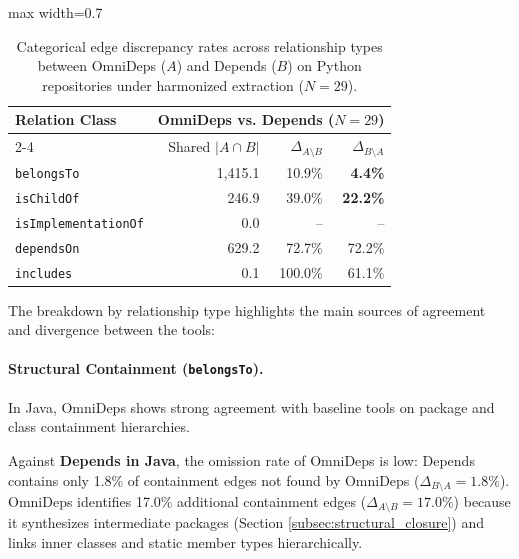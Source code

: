 \begin{table}[htpb]
  \centering
  \small
  \caption{Categorical edge discrepancy rates across relationship
    types between OmniDeps ($A$) and Depends ($B$) on Python repositories
  under harmonized extraction ($N=29$).}
  \label{tab:categorical_discordance_python}
  \vspace{0.4em}
  \begin{adjustbox}{max width=0.7\textwidth}
    \begin{tabular}{lrrr}
      \toprule
      \textbf{Relation Class} &
      \multicolumn{3}{c}{\textbf{OmniDeps vs. Depends ($N=29$)}} \\
      \cmidrule(lr){2-4}
      & Shared $|A \cap B|$ & $\Delta_{A \setminus B}$ & $\Delta_{B
      \setminus A}$ \\
      \midrule
      \texttt{belongsTo}          & 1,415.1 &  10.9\% & \textbf{4.4\%} \\
      \texttt{isChildOf}          &   246.9 &  39.0\% & \textbf{22.2\%} \\
      \texttt{isImplementationOf} &     0.0 &      -- &      --         \\
      \texttt{dependsOn}          &   629.2 &  72.7\% & 72.2\%          \\
      \texttt{includes}           &     0.1 & 100.0\% & 61.1\%          \\
      \bottomrule
    \end{tabular}
  \end{adjustbox}
\end{table}

The breakdown by relationship type highlights the main sources of
agreement and divergence between the tools:

\paragraph{Structural Containment (\texttt{belongsTo}).}
In Java, OmniDeps shows strong agreement with baseline tools on
package and class containment hierarchies.

Against \textbf{Depends in Java}, the omission rate of OmniDeps is
low: Depends contains only 1.8\% of containment edges not found by
OmniDeps ($\Delta_{B \setminus A} = 1.8\%$). OmniDeps identifies
17.0\% additional containment edges ($\Delta_{A \setminus B} =
17.0\%$) because it synthesizes intermediate packages (Section
\ref{subsec:structural_closure}) and links inner classes and static
member types hierarchically.

